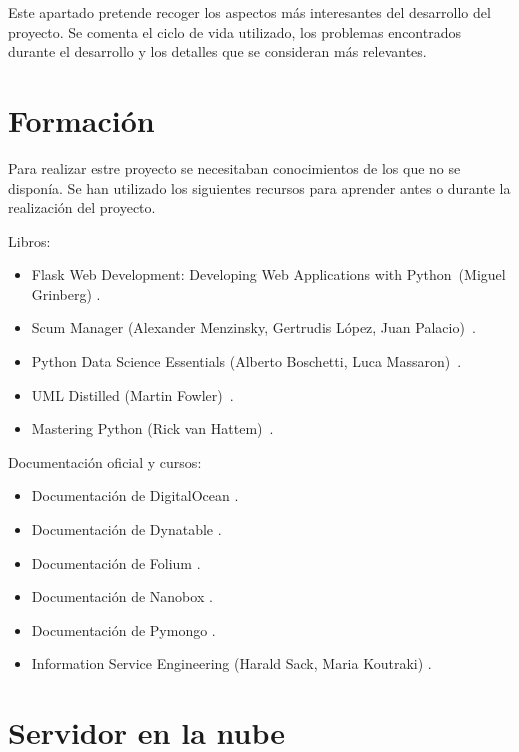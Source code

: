 
Este apartado pretende recoger los aspectos más interesantes del desarrollo del proyecto. Se comenta el ciclo de vida utilizado, los problemas encontrados durante el desarrollo y los detalles que se consideran más relevantes.

\section{Formación}

Para realizar estre proyecto se necesitaban conocimientos de los que no se disponía. Se han utilizado los siguientes recursos para aprender antes o durante la realización del proyecto.

Libros:

\begin{itemize}
	\item Flask Web Development: Developing Web Applications with Python~(Miguel Grinberg) \cite{book:flask}.
	\item Scum Manager (Alexander Menzinsky, Gertrudis López, Juan Palacio)~\cite{book:scrum}.
	\item Python Data Science Essentials (Alberto Boschetti, Luca Massaron)~\cite{book:pythondatascience}.
	\item UML Distilled (Martin Fowler)~\cite{book:umldistilled}.
	\item Mastering Python (Rick van Hattem)~\cite{book:masteringpython}.
\end{itemize}

Documentación oficial y cursos:

\begin{itemize}
	\item Documentación de DigitalOcean \cite{docs:digitalocean}.
	\item Documentación de Dynatable \cite{docs:dynatable}.
	\item Documentación de Folium \cite{docs:folium}.
	\item Documentación de Nanobox \cite{docs:nanobox}.
	\item Documentación de Pymongo \cite{docs:pymongo}.
	\item Information Service Engineering (Harald Sack, Maria Koutraki) \cite{misc:informationserviceengineering}.
\end{itemize}

\section{Servidor en la nube}

